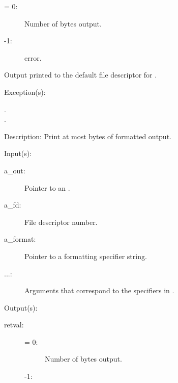 \begin{capi}
\begin{capilist}
\begin{description}
			\begin{description}\item[]
			\item[{\gt}= 0: ]
				Number of bytes output.
			\item[-1: ]
				 error.
			\end{description}
		\item{Output printed to the default file descriptor for
			.}
		\end{description}
	\item[Exception(s): ]
		\begin{description}\item[]
		\item[.]
		\item[.]
		\end{description}
	\item[Description: ]
		Print at most  bytes of formatted output.
	\end{capilist}
\label{out_put_f}
\label{_cw_out_put_f}
	\begin{capilist}
	\item[Input(s): ]
		\begin{description}\item[]
		\item[a\_out: ]
			Pointer to an .
		\item[a\_fd: ]
			File descriptor number.
		\item[a\_format: ]
			Pointer to a formatting specifier string.
		\item[...: ]
			Arguments that correspond to the specifiers in
			.
		\end{description}
	\item[Output(s): ]
		\begin{description}\item[]
		\item[retval: ]
			\begin{description}\item[]
			\item[{\gt}= 0: ]
				Number of bytes output.
			\item[-1: ]

\end{description}
\end{description}
\end{capilist}
\end{capi}
